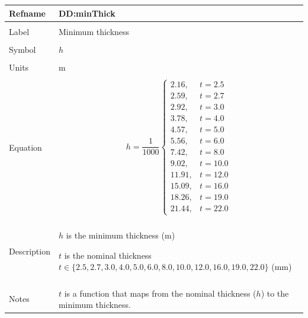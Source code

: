 \documentclass[12pt]{article}
\begin{document}
\vspace{\baselineskip}
\noindent
\begin{minipage}{\textwidth}
\begin{tabular}{>{\raggedright}p{}>{\raggedright\arraybackslash}p{}}
\toprule \textbf{Refname} & \textbf{DD:minThick}
\label{DD:minThick}
\\ \midrule \\
Label & Minimum thickness
        
\\ \midrule \\
Symbol & $h$
         
\\ \midrule \\
Units & ${\text{m}}$
        
\\ \midrule \\
Equation & \begin{displaymath}
           h=\frac{1}{1000} \begin{cases}
                            2.16, & t=2.5\\
                            2.59, & t=2.7\\
                            2.92, & t=3.0\\
                            3.78, & t=4.0\\
                            4.57, & t=5.0\\
                            5.56, & t=6.0\\
                            7.42, & t=8.0\\
                            9.02, & t=10.0\\
                            11.91, & t=12.0\\
                            15.09, & t=16.0\\
                            18.26, & t=19.0\\
                            21.44, & t=22.0
                            \end{cases}
           \end{displaymath}
\\ \midrule \\
Description & \begin{symbDescription}
              \item{$h$ is the minimum thickness (${\text{m}}$)}
              \item{$t$ is the nominal thickness $t\in{}\{2.5,2.7,3.0,4.0,5.0,6.0,8.0,10.0,12.0,16.0,19.0,22.0\}$ (${\text{mm}}$)}
              \end{symbDescription}
\\ \midrule \\
Notes & $t$ is a function that maps from the nominal thickness ($h$) to the minimum thickness.
        

\end{tabular}
\end{minipage}
\end{document}
